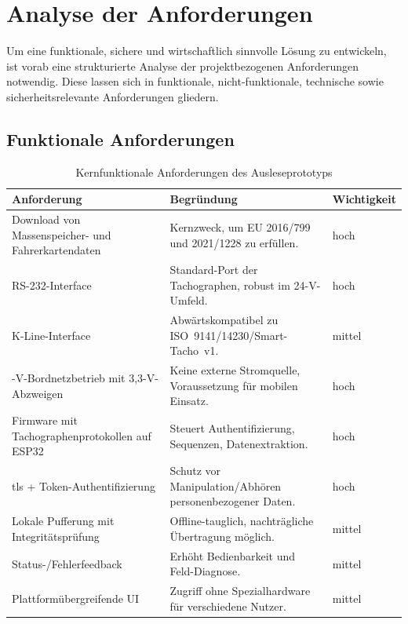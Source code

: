 \chapter{Analyse der Anforderungen}
Um eine funktionale, sichere und wirtschaftlich sinnvolle Lösung zu entwickeln, ist vorab eine strukturierte Analyse der projektbezogenen Anforderungen notwendig. Diese lassen sich in funktionale, nicht-funktionale, technische sowie sicherheitsrelevante Anforderungen gliedern.
\enlargethispage{6\baselineskip}
\section{Funktionale Anforderungen}


\begin{table}[H]
  \centering
  \begin{tabularx}{\textwidth}{|>{\raggedright\arraybackslash}p{}|>{\raggedright\arraybackslash}X|>{\raggedright\arraybackslash}p{}|}
    \hline
    \textbf{Anforderung} & \textbf{Begründung} & \textbf{Wichtigkeit} \\
    \hline
    Download von Massenspeicher- und Fahrerkartendaten & Kernzweck, um EU 2016/799 und 2021/1228 zu erfüllen. & hoch \\
    \hline
    RS-232-Interface & Standard-Port der Tachographen, robust im 24-V-Umfeld. & hoch \\
    \hline
    K-Line-Interface & Abwärtskompatibel zu ISO~9141/14230/Smart-Tacho~v1. & mittel \\
    \hline
    24-V-Bordnetzbetrieb mit 3,3-V-Abzweigen & Keine externe Stromquelle, Voraussetzung für mobilen Einsatz. & hoch \\
    \hline
    Firmware mit Tachographenprotokollen auf ESP32 & Steuert Authentifizierung, Sequenzen, Datenextraktion. & hoch \\
    \hline
    \gls{tls} + Token-Authentifizierung & Schutz vor Manipulation/Abhören personenbezogener Daten. & hoch \\
    \hline
    Lokale Pufferung mit Integritätsprüfung & Offline-tauglich, nachträgliche Übertragung möglich. & mittel \\
    \hline
    Status-/Fehlerfeedback & Erhöht Bedienbarkeit und Feld-Diagnose. & mittel \\
    \hline
    Plattformübergreifende UI & Zugriff ohne Spezialhardware für verschiedene Nutzer. & mittel \\
    \hline
  \end{tabularx}
  \vspace{0.3\baselineskip}
  \caption{Kernfunktionale Anforderungen des Ausleseprototyps}
  \label{tab:funktionale-anforderungen}
\end{table}
\newpage
